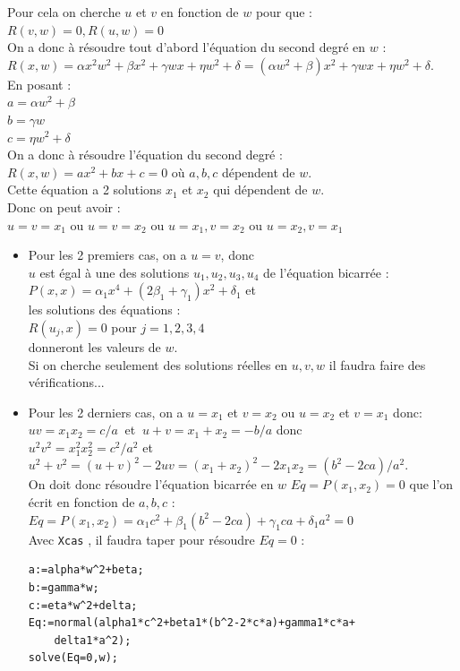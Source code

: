 \documentclass[a4paper,11pt]{book}
\begin{document}
Pour cela on cherche $u$ et $v$ en fonction de $w$ pour que :\\
$R(v,w)=0,R(u,w)=0$\\
On a donc \`a r\'esoudre tout d'abord l'\'equation du second degr\'e en $w$ :\\
$R(x,w)=\alpha x^2w^2+\beta x^2+\gamma wx+\eta w^2+\delta=(\alpha w^2+\beta)x^2+\gamma wx+\eta w^2+\delta$.\\
En posant :\\
$a=\alpha w^2+\beta$\\
$b=\gamma w$\\
$c=\eta w^2+\delta$\\
On a donc \`a r\'esoudre l'\'equation du second degr\'e :\\
$R(x,w)=ax^2+bx+c=0$ o\`u $a,b,c$ d\'ependent de $w$.\\
Cette \'equation a 2 solutions  $x_1$ et $x_2$ qui d\'ependent de $w$.\\
Donc on peut avoir :\\
$u=v=x_1$ ou $u=v=x_2$ ou $u=x_1,v=x_2$ ou  $u=x_2,v=x_1$
\begin{itemize}
\item Pour les 2 premiers cas, on a $u=v$, donc \\
$u$ est \'egal \`a une des solutions $u_1,u_2,u_3,u_4$ de 
l'\'equation bicarr\'ee :\\
$P(x,x)=\alpha_1 x^4+(2\beta_1+\gamma_1) x^2+\delta_1$ et \\
les solutions  des \'equations :\\
$R(u_{j},x)=0$ pour $j=1,2,3,4$\\
donneront les valeurs de $w$.\\
Si on cherche seulement des solutions r\'eelles en $u,v,w$ il faudra faire des 
v\'erifications...
\item Pour les 2 derniers cas, on a $u=x_1$ et $v=x_2$ ou $u=x_2$ et $v=x_1$ 
donc:\\
$uv=x_1x_2=c/a\ $ et $\ u+v=x_1+x_2=-b/a$ donc\\
$u^2v^2=x_1^2x_2^2=c^2/a^2$ et\\
 $u^2+v^2=(u+v)^2-2uv=(x_1+x_2)^2-2x_1x_2=(b^2-2ca)/a^2$.\\
On doit donc r\'esoudre l'\'equation bicarr\'ee en $w$ $Eq=P(x_1,x_2)=0$ que 
l'on \'ecrit en fonction de $a,b,c$ :\\
$Eq=P(x_1,x_2)=\alpha_1 c^2+\beta_1 (b^2-2ca)+\gamma_1 ca +\delta_1 a^2=0$\\
Avec {\tt Xcas} , il faudra taper pour r\'esoudre $Eq=0$ :
\begin{verbatim}
a:=alpha*w^2+beta;
b:=gamma*w;
c:=eta*w^2+delta;
Eq:=normal(alpha1*c^2+beta1*(b^2-2*c*a)+gamma1*c*a+
    delta1*a^2);
solve(Eq=0,w);
\end{verbatim}
\end{itemize}
\end{document}
